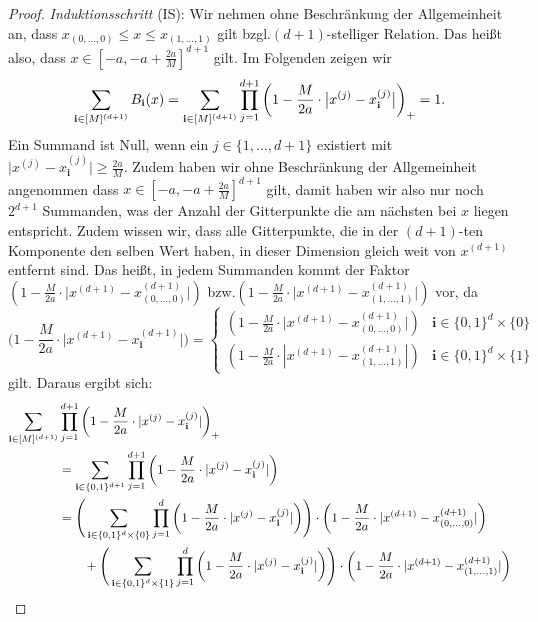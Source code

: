 \begin{proof}
\emph{Induktionsschritt} (IS): Wir nehmen ohne Beschränkung der Allgemeinheit an, dass $x_{(0,\dots,0)} \leq x \leq x_{(1,\dots,1)}$ gilt bzgl.\@ $(d+1)$-stelliger Relation. Das heißt also, dass $x \in [-a, -a + \frac{2a}{M}]^{d + 1}$ gilt. Im Folgenden zeigen wir $$\sum_{\mathbf{i} \in [M]^{(d + 1)}} B_{\mathbf{i}}(x) = \sum_{\mathbf{i} \in [M]^{(d + 1)}}\prod_{j = 1}^{d + 1} \bigg(1 - \frac{M}{2a} \cdot \big|x^{(j)} - x_{\mathbf{i}}^{(j)}\big|\bigg)_+ = 1.$$
Ein Summand ist Null, wenn ein $j \in \{1,\dots,d+1\}$ existiert mit $\big|x^{(j)} - x_{\mathbf{i}}^{(j)}\big| \geq \frac{2a}{M}$. Zudem haben wir ohne Beschränkung der Allgemeinheit angenommen dass $x \in [-a, -a + \frac{2a}{M}]^{d + 1}$ gilt, damit haben wir also nur noch $2^{d + 1}$ Summanden, was der Anzahl der Gitterpunkte die am nächsten bei $x$ liegen entspricht. Zudem wissen wir, dass alle Gitterpunkte, die in der $(d + 1)$-ten Komponente den selben Wert haben, in dieser Dimension gleich weit von $x^{(d + 1)}$ entfernt sind. Das heißt, in jedem Summanden kommt der Faktor $(1 - \frac{M}{2a} \cdot \big|x^{(d + 1)} - x_{(0,\dots,0)}^{(d + 1)}\big|)$ bzw.\@ $(1 - \frac{M}{2a} \cdot \big|x^{(d + 1)} - x_{(1,\dots,1)}^{(d + 1)}\big|)$ vor, da 
\begin{equation*}
\bigg(1 - \frac{M}{2a} \cdot \Big|x^{(d + 1)} - x_\mathbf{i}^{(d + 1)}\Big|\bigg) = \begin{cases}
(1 - \frac{M}{2a} \cdot \big|x^{(d + 1)} - x_{(0,\dots,0)}^{(d + 1)}\big|) &\text{$\mathbf{i} \in \{0, 1\}^d \times \{0\}$}\\
(1 - \frac{M}{2a} \cdot |x^{(d + 1)} - x_{(1,\dots,1)}^{(d + 1)}|) &\text{$\mathbf{i} \in \{0, 1\}^d \times \{1\}$}
\end{cases}
\end{equation*}
gilt. Daraus ergibt sich:
\begin{equation*}
\begin{split}
\sum_{\bi \in [M]^{(d + 1)}} & \prod_{j = 1}^{d + 1} \bigg(1 - \frac{M}{2a} \cdot |x^{(j)} - x_{\mathbf{i}}^{(j)}|\bigg)_+ \\
& = \sum_{\mathbf{i} \in \{0, 1\}^{d + 1}} \prod_{j = 1}^{d + 1} \bigg(1 - \frac{M}{2a} \cdot |x^{(j)} - x_{\bi}^{(j)}|\bigg) \\
& = \Bigg(\sum_{\mathbf{i} \in \{0, 1\}^d \times \{0\}} \prod_{j = 1}^{d} \bigg(1 - \frac{M}{2a} \cdot |x^{(j)} - x_{\bi}^{(j)}|\bigg)\Bigg) \cdot \bigg(1 - \frac{M}{2a} \cdot |x^{(d + 1)} - x_{(0,\dots,0)}^{(d + 1)}|\bigg) \\
& \qquad + \Bigg(\sum_{\mathbf{i} \in \{0, 1\}^d \times \{1\}} \prod_{j = 1}^{d} \bigg(1 - \frac{M}{2a} \cdot |x^{(j)} - x_{\bi}^{(j)}|\bigg)\Bigg) \cdot \bigg(1 - \frac{M}{2a} \cdot |x^{(d + 1)} - x_{(1,\dots,1)}^{(d + 1)}|\bigg) \\

\end{split}
\end{equation*}
\end{proof}
